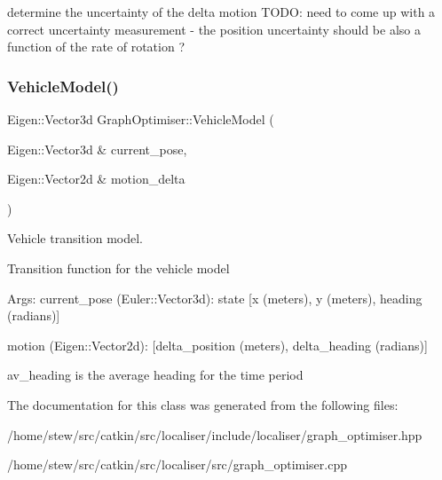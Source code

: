 determine the uncertainty of the delta motion T\+O\+DO\+: need to come up with a correct uncertainty measurement -\/ the position uncertainty should be also a function of the rate of rotation ? \mbox{\label{classGraphOptimiser_a3310a9869b3cec56fb9ccc6a0c944e15}} 
\subsubsection{\texorpdfstring{Vehicle\+Model()}{VehicleModel()}}
{\footnotesize\ttfamily Eigen\+::\+Vector3d Graph\+Optimiser\+::\+Vehicle\+Model (\begin{DoxyParamCaption}\item[{Eigen\+::\+Vector3d \&}]{current\+\_\+pose,  }\item[{Eigen\+::\+Vector2d \&}]{motion\+\_\+delta }\end{DoxyParamCaption})}

Vehicle transition model.

Transition function for the vehicle model

Args\+: current\+\_\+pose (Euler\+::\+Vector3d)\+: state \mbox{[}x (meters), y (meters), heading (radians)\mbox{]}

motion (Eigen\+::\+Vector2d)\+: \mbox{[}delta\+\_\+position (meters), delta\+\_\+heading (radians)\mbox{]}

av\+\_\+heading is the average heading for the time period 

The documentation for this class was generated from the following files\+:\begin{DoxyCompactItemize}
\item 
/home/stew/src/catkin/src/localiser/include/localiser/graph\+\_\+optimiser.\+hpp\item 
/home/stew/src/catkin/src/localiser/src/graph\+\_\+optimiser.\+cpp\end{DoxyCompactItemize}
